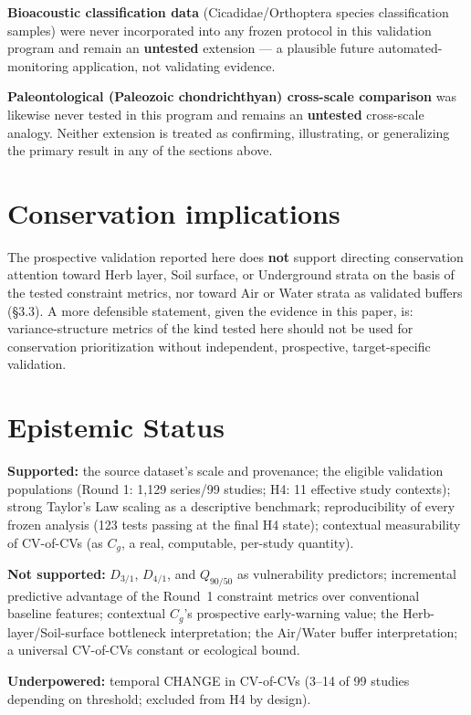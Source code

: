 \documentclass[11pt]{article}
\newcommand{\Dthreeone}{D_{3/1}}
\newcommand{\Dfourone}{D_{4/1}}
\newcommand{\Qninefifty}{Q_{90/50}}
\newcommand{\Cg}{C_g}
\begin{document}
\textbf{Bioacoustic classification data} (Cicadidae/Orthoptera species
classification samples) were never incorporated into any frozen protocol
in this validation program and remain an \textbf{untested} extension ---
a plausible future automated-monitoring application, not validating
evidence.

\textbf{Paleontological (Paleozoic chondrichthyan) cross-scale
comparison} was likewise never tested in this program and remains an
\textbf{untested} cross-scale analogy. Neither extension is treated as
confirming, illustrating, or generalizing the primary result in any of
the sections above.

\section{Conservation implications}

The prospective validation reported here does \textbf{not} support
directing conservation attention toward Herb layer, Soil surface, or
Underground strata on the basis of the tested constraint metrics, nor
toward Air or Water strata as validated buffers (\S3.3). A more
defensible statement, given the evidence in this paper, is: variance-structure
metrics of the kind tested here should not be used for conservation
prioritization without independent, prospective, target-specific
validation.

\section{Epistemic Status}

\textbf{Supported:} the source dataset's scale and provenance; the
eligible validation populations (Round 1: 1{,}129 series/99 studies; H4:
11 effective study contexts); strong Taylor's Law scaling as a
descriptive benchmark; reproducibility of every frozen analysis
(123 tests passing at the final H4 state); contextual measurability of
CV-of-CVs (as $\Cg$, a real, computable, per-study quantity).

\textbf{Not supported:} $\Dthreeone$, $\Dfourone$, and $\Qninefifty$ as
vulnerability predictors; incremental predictive advantage of the Round~1
constraint metrics over conventional baseline features; contextual
$\Cg$'s prospective early-warning value; the Herb-layer/Soil-surface
bottleneck interpretation; the Air/Water buffer interpretation; a
universal CV-of-CVs constant or ecological bound.

\textbf{Underpowered:} temporal CHANGE in CV-of-CVs (3--14 of 99 studies
depending on threshold; excluded from H4 by design).
\end{document}

